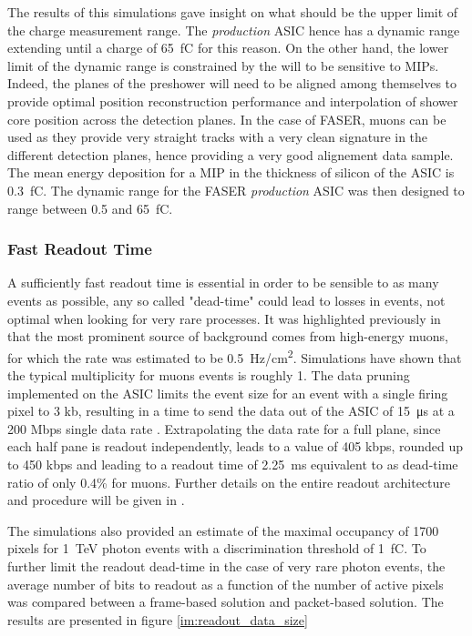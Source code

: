 		The results of this simulations gave insight on what should be the upper limit of the charge measurement range. The \textit{production} ASIC hence has a dynamic range extending until a charge of \SI{65}{\femto\coulomb} for this reason. On the other hand, the lower limit of the dynamic range is constrained by the will to be sensitive to MIPs. Indeed, the planes of the preshower will need to be aligned among themselves to provide optimal position reconstruction performance and interpolation of shower core position across the detection planes. In the case of FASER, muons can be used as they provide very straight tracks with a very clean signature in the different detection planes, hence providing a very good alignement data sample. The mean energy deposition for a MIP in the thickness of silicon of the ASIC is \SI{0.3}{\femto\coulomb}. The dynamic range for the FASER \textit{production} ASIC was then designed to range between 0.5 and \SI{65}{\femto\coulomb}.
		
		\subsubsection{Fast Readout Time}
		A sufficiently fast readout time is essential in order to be sensible to as many events as possible, any so called "dead-time" could lead to losses in events, not optimal when looking for very rare processes. It was highlighted previously in  that the most prominent source of background comes from high-energy muons, for which the rate was estimated to be \SI{0.5}{\hertz/\centi\meter\squared}. Simulations have shown that the typical multiplicity for muons events is roughly 1. The data pruning implemented on the ASIC limits the event size for an event with a single firing pixel to 3 kb, resulting in a time to send the data out of the ASIC of \SI{15}{\micro\second} at a 200 Mbps single data rate \cite{PreShower_TP}. Extrapolating the data rate for a full plane, since each half pane is readout independently, leads to a value of 405 kbps, rounded up to 450 kbps \cite{PreShower_TP} and leading to a readout time of \SI{2.25}{\milli\second} equivalent to as dead-time ratio of only 0.4\% for muons. Further details on the entire readout architecture and procedure will be given in .
		
			The simulations also provided an estimate of the maximal occupancy of 1700 pixels for \SI{1}{\tera\electronvolt} photon events with a discrimination threshold of \SI{1}{\femto\coulomb}. To further limit the readout dead-time in the case of very rare photon events, the average number of bits to readout as a function of the number of active pixels was compared between a frame-based solution and packet-based solution. The results are presented in figure \ref{im:readout_data_size}
			
